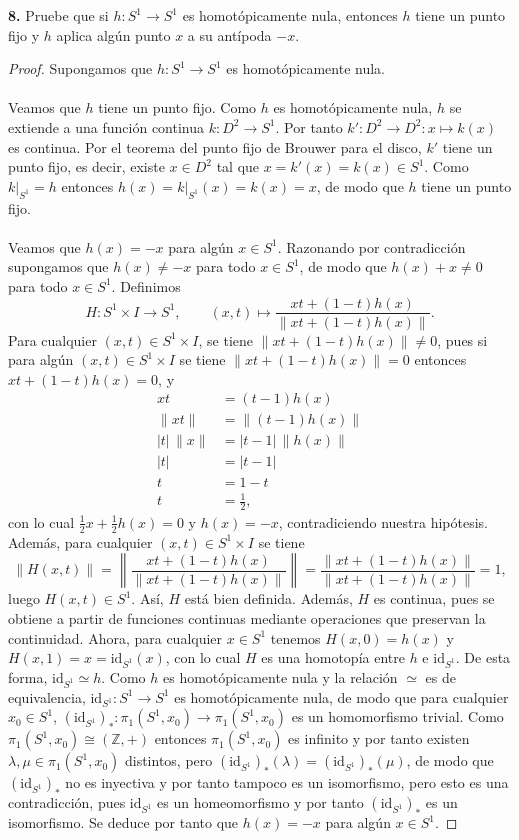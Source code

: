\textbf{8.} Pruebe que si $h:S^1\to S^1$ es homotópicamente nula, entonces $h$ tiene un punto fijo y $h$ aplica algún punto $x$ a su antípoda $-x$.
\begin{proof}
Supongamos que $h:S^1\to S^1$ es homotópicamente nula.\\\\
Veamos que $h$ tiene un punto fijo. Como $h$ es homotópicamente nula, $h$ se extiende a una función continua $k:D^2\to S^1$. Por tanto $k':D^2\to D^2:x\mapsto k(x)$ es continua. Por el teorema del punto fijo de Brouwer para el disco, $k'$ tiene un punto fijo, es decir, existe $x\in D^2$ tal que $x=k'(x)=k(x)\in S^1$. Como $k|_{S^1}=h$ entonces $h(x)=k|_{S^1}(x)=k(x)=x$, de modo que $h$ tiene un punto fijo.\\\\
Veamos que $h(x)=-x$ para algún $x\in S^1$. Razonando por contradicción supongamos que $h(x)\neq -x$ para todo $x\in S^1$, de modo que $h(x)+x\neq 0$ para todo $x\in S^1$. Definimos
\[
H:S^1\times I\to S^1,\qquad (x,t)\mapsto \frac{xt+(1-t)h(x)}{\lVert xt+(1-t)h(x)\rVert }.
\]
Para cualquier $(x,t)\in S^1\times I$, se tiene $\lVert xt+(1-t)h(x)\rVert \neq 0$, pues si para algún $(x,t)\in S^1\times I$ se tiene $\lVert xt+(1-t)h(x)\rVert =0$ entonces $xt+(1-t)h(x)=0$, y
\begin{align*}
xt&=(t-1)h(x)\\
\lVert xt\rVert &=\lVert (t-1)h(x)\rVert \\
|t|\,\lVert x\rVert &=|t-1|\,\lVert h(x)\rVert \\
|t|&=|t-1|\\
t&=1-t\\
t&=\tfrac12,
\end{align*}
con lo cual $\tfrac12 x+\tfrac12 h(x)=0$ y $h(x)=-x$, contradiciendo nuestra hipótesis. Además, para cualquier $(x,t)\in S^1\times I$ se tiene
\[
\lVert H(x,t)\rVert =\left\lVert \frac{xt+(1-t)h(x)}{\lVert xt+(1-t)h(x)\rVert }\right\rVert =\frac{\lVert xt+(1-t)h(x)\rVert }{\lVert xt+(1-t)h(x)\rVert }=1,
\]
luego $H(x,t)\in S^1$. Así, $H$ está bien definida. Además, $H$ es continua, pues se obtiene a partir de funciones continuas mediante operaciones que preservan la continuidad. Ahora, para cualquier $x\in S^1$ tenemos $H(x,0)=h(x)$ y $H(x,1)=x=\mathrm{id}_{S^1}(x)$, con lo cual $H$ es una homotopía entre $h$ e $\mathrm{id}_{S^1}$. De esta forma, $\mathrm{id}_{S^1}\simeq h$. Como $h$ es homotópicamente nula y la relación $\simeq$ es de equivalencia, $\mathrm{id}_{S^1}:S^1\to S^1$ es homotópicamente nula, de modo que para cualquier $x_0\in S^1$, $(\mathrm{id}_{S^1})_*:\pi_1(S^1,x_0)\to\pi_1(S^1,x_0)$ es un homomorfismo trivial. Como $\pi_1(S^1,x_0)\cong(\mathbb{Z},+)$ entonces $\pi_1(S^1,x_0)$ es infinito y por tanto existen $\lambda,\mu\in\pi_1(S^1,x_0)$ distintos, pero $(\mathrm{id}_{S^1})_*(\lambda)=(\mathrm{id}_{S^1})_*(\mu)$, de modo que $(\mathrm{id}_{S^1})_*$ no es inyectiva y por tanto tampoco es un isomorfismo, pero esto es una contradicción, pues $\mathrm{id}_{S^1}$ es un homeomorfismo y por tanto $(\mathrm{id}_{S^1})_*$ es un isomorfismo. Se deduce por tanto que $h(x)=-x$ para algún $x\in S^1$.
\end{proof}\clearpage
